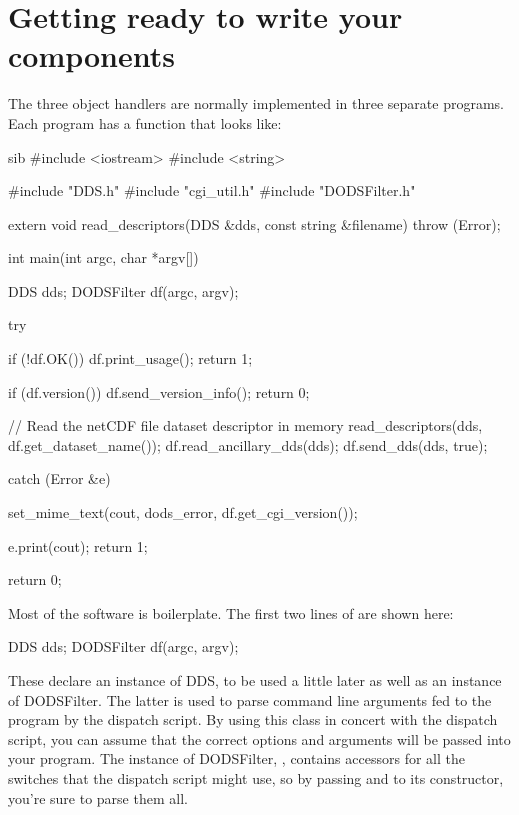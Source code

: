 \documentclass{dods-paper}
\begin{document}
\section{Getting ready to write your components}

The three object handlers are normally implemented in three separate
programs.  Each program has a  function that looks like:

\begin{vcode}{sib} 
#include <iostream>
#include <string>

#include "DDS.h"
#include "cgi_util.h"
#include "DODSFilter.h"

extern void read_descriptors(DDS &dds, const string &filename)
    throw  (Error);

int 
main(int argc, char *argv[])
{
    DDS dds;
    DODSFilter df(argc, argv);
       
    try {
        if (!df.OK()) {
            df.print_usage();
            return 1;
        }
        
        if (df.version()) {
            df.send_version_info();
            return 0;
        }

        // Read the netCDF file dataset descriptor in memory
        read_descriptors(dds,  df.get_dataset_name());
        df.read_ancillary_dds(dds);
        df.send_dds(dds, true);
    }

    catch (Error &e) {
        set_mime_text(cout, dods_error,
        df.get_cgi_version());

        e.print(cout);
        return 1;
    }

    return 0;
}
\end{vcode}


Most of the software is boilerplate. The first two lines of
 are shown here:

\begin{vcode}
DDS dds;
DODSFilter df(argc, argv);
\end{vcode}

These declare an instance of DDS, to be used a little later as well as an
instance of DODSFilter. The latter is used to parse command line arguments
fed to the program by the dispatch script. By using this class in concert
with the dispatch script, you can assume that the correct options and
arguments will be passed into your program. The instance of DODSFilter,
, contains accessors for all the switches that the dispatch script
might use, so by passing  and  to its constructor, you're
sure to parse them all.
\end{document}

